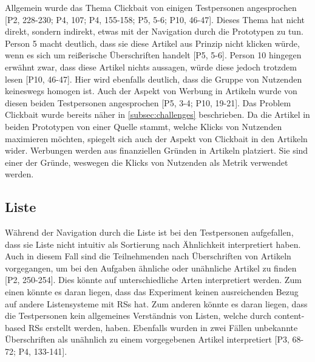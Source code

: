 Allgemein wurde das Thema Clickbait von einigen Testpersonen angesprochen [P2, 228-230; P4, 107; P4, 155-158; P5, 5-6; P10, 46-47].
Dieses Thema hat nicht direkt, sondern indirekt, etwas mit der Navigation durch die Prototypen zu tun.
Person 5 macht deutlich, dass sie diese Artikel aus Prinzip nicht klicken würde, wenn es sich um reißerische Überschriften handelt [P5, 5-6].
Person 10 hingegen erwähnt zwar, dass diese Artikel \glqq nichts aussagen\grqq{}, würde diese jedoch trotzdem lesen [P10, 46-47].
Hier wird ebenfalls deutlich, dass die Gruppe von Nutzenden keineswegs homogen ist.
Auch der Aspekt von Werbung in Artikeln wurde von diesen beiden Testpersonen angesprochen [P5, 3-4; P10, 19-21].
Das Problem Clickbait wurde bereits näher in \autoref{subsec:challenges} beschrieben.
Da die Artikel in beiden Prototypen von einer Quelle stammt, welche Klicks von Nutzenden maximieren möchten, spiegelt sich auch der Aspekt von Clickbait in den Artikeln wider.
Werbungen werden aus finanziellen Gründen in Artikeln platziert.
Sie sind einer der Gründe, weswegen die Klicks von Nutzenden als Metrik verwendet werden.

\subsection{Liste}
Während der Navigation durch die Liste ist bei den Testpersonen aufgefallen, dass sie Liste nicht intuitiv als Sortierung nach Ähnlichkeit interpretiert haben.
Auch in diesem Fall sind die Teilnehmenden nach Überschriften von Artikeln vorgegangen, um bei den Aufgaben ähnliche oder unähnliche Artikel zu finden [P2, 250-254].
Dies könnte auf unterschiedliche Arten interpretiert werden.
Zum einen könnte es daran liegen, dass das Experiment keinen ausreichenden Bezug auf andere Listensysteme mit \acp{RS} hat.
Zum anderen könnte es daran liegen, dass die Testpersonen kein allgemeines Verständnis von Listen, welche durch content-based \acp{RS} erstellt werden, haben.
Ebenfalls wurden in zwei Fällen unbekannte Überschriften als unähnlich zu einem vorgegebenen Artikel interpretiert [P3, 68-72; P4, 133-141].\\

